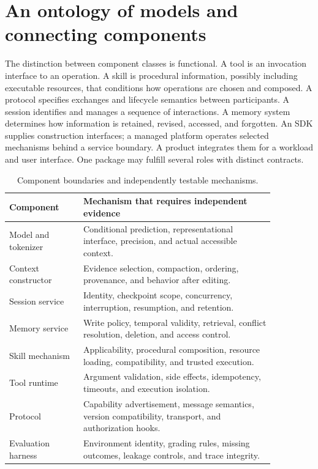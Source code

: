 \section{An ontology of models and connecting components}\label{sec:C01:04}
The distinction between component classes is functional. A tool is an invocation interface to an operation. A skill is procedural information, possibly including executable resources, that conditions how operations are chosen and composed. A protocol specifies exchanges and lifecycle semantics between participants. A session identifies and manages a sequence of interactions. A memory system determines how information is retained, revised, accessed, and forgotten. An SDK supplies construction interfaces; a managed platform operates selected mechanisms behind a service boundary. A product integrates them for a workload and user interface. One package may fulfill several roles with distinct contracts.

\begin{table}[!htbp]
\centering
\caption{Component boundaries and independently testable mechanisms.}\label{tab:C01:components}
\begin{tabular}{L{0.24\linewidth}L{0.62\linewidth}}

\toprule Component & Mechanism that requires independent evidence\\\midrule
Model and tokenizer & Conditional prediction, representational interface, precision, and actual accessible context.\\
Context constructor & Evidence selection, compaction, ordering, provenance, and behavior after editing.\\
Session service & Identity, checkpoint scope, concurrency, interruption, resumption, and retention.\\
Memory service & Write policy, temporal validity, retrieval, conflict resolution, deletion, and access control.\\
Skill mechanism & Applicability, procedural composition, resource loading, compatibility, and trusted execution.\\
Tool runtime & Argument validation, side effects, idempotency, timeouts, and execution isolation.\\
Protocol & Capability advertisement, message semantics, version compatibility, transport, and authorization hooks.\\
Evaluation harness & Environment identity, grading rules, missing outcomes, leakage controls, and trace integrity.\\
\bottomrule
\end{tabular}
\end{table}

